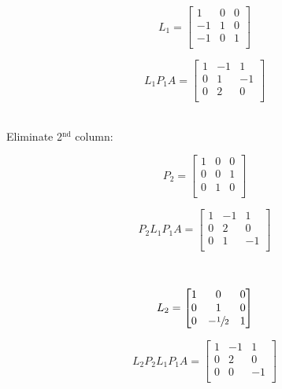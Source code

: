 \documentclass[12pt]{article}
\begin{document}
\begin{minipage}[t]{0.5\textwidth}
    $$
        L_1 =
        \begin{bmatrix}
            1  & 0 & 0 \\
            -1 & 1 & 0 \\
            -1 & 0 & 1 \\
        \end{bmatrix}
    $$
\end{minipage}
\begin{minipage}[t]{0.5\textwidth}
    $$
        L_1P_1A =
        \begin{bmatrix}
            1 & -1 & 1  \\
            0 & 1  & -1 \\
            0 & 2  & 0  \\
        \end{bmatrix}
    $$
\end{minipage}\\

Eliminate 2$^{\text{nd}}$ column:\\
\begin{minipage}[t]{0.5\textwidth}
    $$
        P_2 =
        \begin{bmatrix}
            1 & 0 & 0 \\
            0 & 0 & 1 \\
            0 & 1 & 0 \\
        \end{bmatrix}
    $$
\end{minipage}
\begin{minipage}[t]{0.5\textwidth}
    $$
        P_2 L_1P_1A =
        \begin{bmatrix}
            1 & -1 & 1  \\
            0 & 2  & 0  \\
            0 & 1  & -1 \\
        \end{bmatrix}
    $$
\end{minipage}\\
\begin{minipage}[t]{0.5\textwidth}
    $$
        L_2 =
        \begin{bmatrix}
            1 & 0             & 0 \\
            0 & 1             & 0 \\
            0 & -\sfrac{1}{2} & 1 \\
        \end{bmatrix}
    $$
\end{minipage}
\begin{minipage}[t]{0.5\textwidth}
    $$
        L_2 P_2 L_1P_1A =
        \begin{bmatrix}
            1 & -1 & 1  \\
            0 & 2  & 0  \\
            0 & 0  & -1 \\
        \end{bmatrix}
    $$
\end{minipage}\\\\
\end{document}
